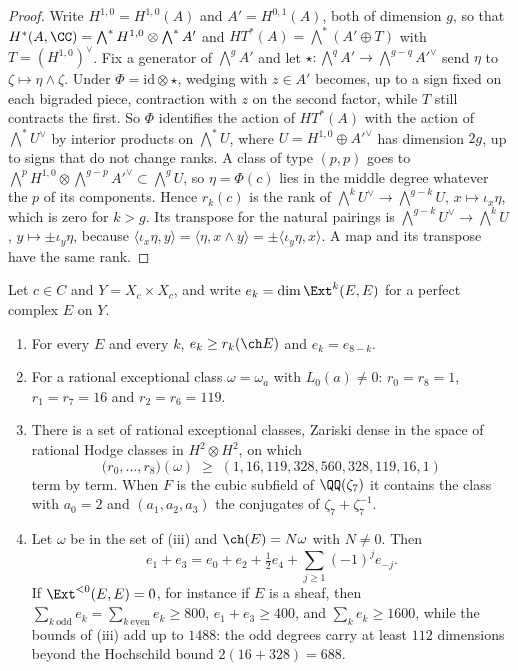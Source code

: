 \begin{proof}
Write $H^{1,0}=H^{1,0}(A)$ and $A'=H^{0,1}(A)$, both of dimension $g$, so
that $H^{*}(A,\CC)=\bigwedge^{*}H^{1,0}\otimes\bigwedge^{*}A'$ and
$HT^{*}(A)=\bigwedge^{*}(A'\oplus T)$ with $T=(H^{1,0})^{\vee}$. Fix a
generator of $\bigwedge^{g}A'$ and let
$\star\colon\bigwedge^{q}A'\to\bigwedge^{g-q}A'^{\vee}$ send $\eta$ to
$\zeta\mapsto\eta\wedge\zeta$. Under $\Phi=\mathrm{id}\otimes\star$, wedging
with $z\in A'$ becomes, up to a sign fixed on each bigraded piece, contraction
with $z$ on the second factor, while $T$ still contracts the first. So $\Phi$
identifies the action of $HT^{*}(A)$ with the action of
$\bigwedge^{*}U^{\vee}$ by interior products on $\bigwedge^{*}U$, where
$U=H^{1,0}\oplus A'^{\vee}$ has dimension $2g$, up to signs that do not change
ranks. A class of type $(p,p)$ goes to
$\bigwedge^{p}H^{1,0}\otimes\bigwedge^{g-p}A'^{\vee}\subset\bigwedge^{g}U$,
so $\eta=\Phi(c)$ lies in the middle degree whatever the $p$ of its
components. Hence $r_{k}(c)$ is the rank of
$\bigwedge^{k}U^{\vee}\to\bigwedge^{g-k}U$, $x\mapsto\iota_{x}\eta$, which is
zero for $k>g$. Its transpose for the natural pairings is
$\bigwedge^{g-k}U^{\vee}\to\bigwedge^{k}U$, $y\mapsto\pm\iota_{y}\eta$,
because $\langle\iota_{x}\eta,y\rangle=\langle\eta,x\wedge y\rangle
=\pm\langle\iota_{y}\eta,x\rangle$. A map and its transpose have the same
rank.
\end{proof}

\begin{theorem}\label{thm:mumfordprofile}
Let $c\in C$ and $Y=X_{c}\times X_{c}$, and write
$e_{k}=\dim\Ext^{k}(E,E)$ for a perfect complex $E$ on $Y$.
\begin{enumerate}[label=\textup{(\roman*)},leftmargin=2.6em,itemsep=2pt]
\item For every $E$ and every $k$, $e_{k}\ge r_{k}(\ch E)$ and
  $e_{k}=e_{8-k}$.
\item For a rational exceptional class $\omega=\omega_{a}$ with
  $L_{0}(a)\ne0$: $r_{0}=r_{8}=1$, $r_{1}=r_{7}=16$ and $r_{2}=r_{6}=119$.
\item There is a set of rational exceptional classes, Zariski dense in the
  space of rational Hodge classes in $H^{2}\otimes H^{2}$, on which
  \[
    \bigl(r_{0},\dots,r_{8}\bigr)(\omega)\;\ge\;
    (1,16,119,328,560,328,119,16,1)
  \]
  term by term. When $F$ is the cubic subfield of $\QQ(\zeta_{7})$ it contains
  the class with $a_{0}=2$ and $(a_{1},a_{2},a_{3})$ the conjugates of
  $\zeta_{7}+\zeta_{7}^{-1}$.
\item Let $\omega$ be in the set of (iii) and $\ch(E)=N\omega$ with $N\ne0$.
  Then
  \[
    e_{1}+e_{3}=e_{0}+e_{2}+\tfrac12e_{4}
      +\sum_{j\ge1}(-1)^{j}e_{-j}.
  \]
  If $\Ext^{<0}(E,E)=0$, for instance if $E$ is a sheaf, then
  $\sum_{k\ \mathrm{odd}}e_{k}=\sum_{k\ \mathrm{even}}e_{k}\ge800$,
  $e_{1}+e_{3}\ge400$, and $\sum_{k}e_{k}\ge1600$, while the bounds of
  (iii) add up to $1488$: the odd degrees carry at least $112$ dimensions
  beyond the Hochschild bound $2(16+328)=688$.
\end{enumerate}
\end{theorem}

